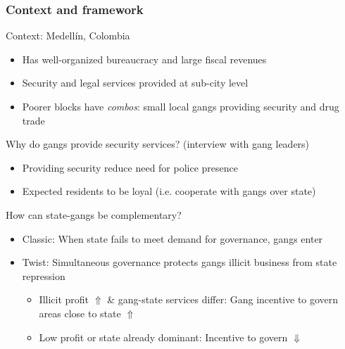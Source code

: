 \documentclass[aspectratio=169]{beamer}
\begin{document}
\begin{frame}
\frametitle{Context and framework} 
Context: Medellín, Colombia
\begin{itemize}\setlength\itemsep{3pt}
  \item Has well-organized bureaucracy and large fiscal revenues
  \item Security and legal services provided at sub-city level
  \item Poorer blocks have \textit{combos}: small local gangs providing security and drug trade
\end{itemize} \medskip
Why do gangs provide security services? (interview with gang leaders)
\begin{itemize}\setlength\itemsep{3pt}
  \item Providing security reduce need for police presence
  \item Expected residents to be loyal (i.e. cooperate with gangs over state)
\end{itemize}
How can state-gangs be complementary?
\begin{itemize}\setlength\itemsep{3pt}
  \item Classic: When state fails to meet demand for governance, gangs enter
  \item Twist: Simultaneous governance protects gangs illicit business from state repression
  \begin{itemize}\setlength\itemsep{3pt}
  \item Illicit profit $\Uparrow$ \& gang-state services differ: Gang incentive to govern areas close to state $\Uparrow$
  \item Low profit or state already dominant: Incentive to govern $\Downarrow$
  \end{itemize}
\end{itemize}
\end{frame}
\end{document}
